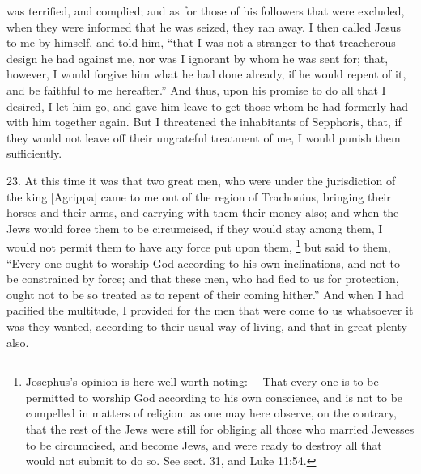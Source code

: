 was terrified, and complied; and as for those of his followers that were
excluded, when they were informed that he was seized, they ran away. I
then called Jesus to me by himself, and told him, ``that I was not a
stranger to that treacherous design he had against me, nor was I ignorant
by whom he was sent for; that, however, I would forgive him what he had
done already, if he would repent of it, and be faithful to me hereafter.''
And thus, upon his promise to do all that I desired, I let him go, and
gave him leave to get those whom he had formerly had with him together
again. But I threatened the inhabitants of Sepphoris, that, if they would
not leave off their ungrateful treatment of me, I would punish them
sufficiently.

23. At this time it was that two great men, who were under the
jurisdiction of the king [Agrippa] came to me out of the region of
Trachonius, bringing their horses and their arms, and carrying with them
their money also; and when the Jews would force them to be circumcised, if
they would stay among them, I would not permit them to have any force put
upon them, \footnote{Josephus's opinion is
here well worth noting:— That every one is to be permitted to
worship God according to his own conscience, and is not to be compelled in
matters of religion: as one may here observe, on the contrary, that the
rest of the Jews were still for obliging all those who married Jewesses to
be circumcised, and become Jews, and were ready to destroy all that would
not submit to do so. See sect. 31, and Luke 11:54.}
but said to them, ``Every one ought to worship God according to his own
inclinations, and not to be constrained by force; and that these men, who
had fled to us for protection, ought not to be so treated as to repent of
their coming hither.'' And when I had pacified the multitude, I provided
for the men that were come to us whatsoever it was they wanted, according
to their usual way of living, and that in great plenty also.

